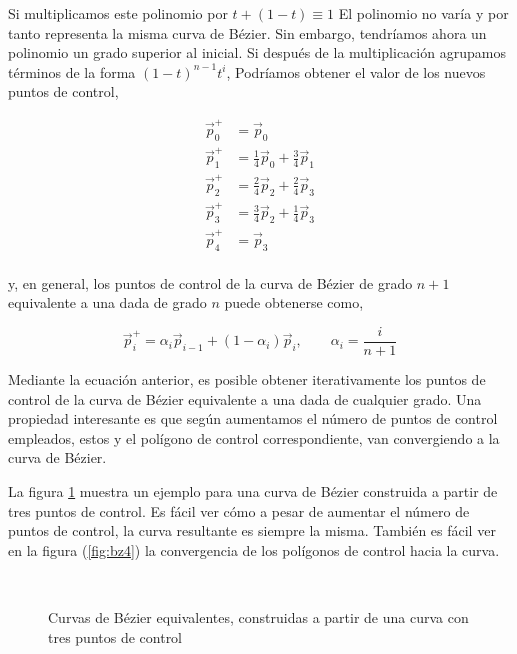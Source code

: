 Si multiplicamos este polinomio por $ t + (1 -t) \equiv 1$ El polinomio no varía y por tanto representa la misma curva de Bézier. Sin embargo, tendríamos ahora un polinomio un grado superior al inicial.  Si después de la multiplicación agrupamos términos de la forma $(1-t)^{n-1}t^i$, Podríamos obtener el valor de los nuevos puntos de control,

\begin{align*}
\vec{p}_0^+&= \vec{p}_0\\
\vec{p}_1^+&= \frac{1}{4}\vec{p}_0 + \frac{3}{4}\vec{p}_1\\
\vec{p}_2^+&= \frac{2}{4}\vec{p}_2 + \frac{2}{4}\vec{p}_3\\
\vec{p}_3^+&= \frac{3}{4}\vec{p}_2 + \frac{1}{4}\vec{p}_3\\
\vec{p}_4^+&= \vec{p}_3\\
\end{align*}

y, en general, los puntos de control de la curva de Bézier de grado $n+1$ equivalente  a una dada de grado $n$ puede obtenerse como,

\begin{equation*}
\vec{p}_i^+ = \alpha_i\vec{p}_{i-1} + (1-\alpha_i)\vec{p}_i, \qquad \alpha_i =\frac{i}{n+1}
\end{equation*}

Mediante la ecuación anterior, es posible obtener iterativamente los puntos de control de la curva de Bézier equivalente a una dada de cualquier grado. Una propiedad interesante es que según aumentamos el número de puntos de control empleados, estos y el polígono de control correspondiente, van convergiendo a la curva de Bézier. 

La figura \ref{fig:bzgrad} muestra un ejemplo para una curva de Bézier construida a partir de tres puntos de control. Es fácil ver cómo a pesar de aumentar el número de puntos de control, la curva resultante es siempre la misma.  También es fácil ver en la figura (\ref{fig:bz4}) la convergencia de los polígonos de control hacia la curva.

\begin{figure}[h]
\centering
{} \qquad 
{}\\
 \qquad 
{}
\caption{Curvas de Bézier equivalentes, construidas a partir de una curva con tres puntos de control} 
\label{fig:bzgrad}
\end{figure}

